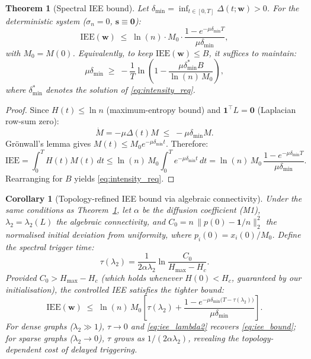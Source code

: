\documentclass[review,12pt]{elsarticle}
\newcommand{\bfw}{\mathbf{w}}
\newcommand{\IEE}{\mathrm{IEE}}
\newcommand{\Hc}{H_c}
\newcommand{\Hmax}{H_{\max}}
\newcommand{\lambdat}{\lambda_2}
\newtheorem{theorem}{Theorem}
\newtheorem{corollary}{Corollary}
\begin{document}
\begin{theorem}[Spectral IEE bound]
\label{thm:iee_bound}
Let $\delta_{\min} = \inf_{t\in[0,T]}\Delta(t;\bfw) > 0$.
For the deterministic system ($\sigma_n = 0$, $\mathbf{s}\equiv\mathbf{0}$):
\begin{equation}
  \IEE(\bfw) \;\leq\; \ln(n)\cdot M_0 \cdot
  \frac{1 - e^{-\mu\delta_{\min}T}}{\mu\delta_{\min}},
  \label{eq:iee_bound}
\end{equation}
with $M_0 = M(0)$.  Equivalently, to keep $\IEE(\bfw) \leq B$, it suffices
to maintain:
\begin{equation}
  \mu\delta_{\min} \;\geq\;
  -\frac{1}{T}\ln\!\left(1 - \frac{\mu\delta_{\min}^* B}{\ln(n)\,M_0}\right),
  \label{eq:intensity_req}
\end{equation}
where $\delta_{\min}^*$ denotes the solution of \eqref{eq:intensity_req}.
\end{theorem}

\begin{proof}
Since $H(t) \leq \ln n$ (maximum-entropy bound) and
$\mathbf{1}^\top L = \mathbf{0}$ (Laplacian row-sum zero):
\[
  \dot{M} = -\mu\Delta(t)M \;\leq\; -\mu\delta_{\min}M.
\]
Grönwall's lemma gives $M(t) \leq M_0 e^{-\mu\delta_{\min}t}$.  Therefore:
\[
  \IEE = \int_0^T H(t)M(t)\,dt
  \leq \ln(n)\,M_0\int_0^T e^{-\mu\delta_{\min}t}\,dt
  = \ln(n)\,M_0\,\frac{1-e^{-\mu\delta_{\min}T}}{\mu\delta_{\min}}.
\]
Rearranging for $B$ yields \eqref{eq:intensity_req}.
\end{proof}

\begin{corollary}[Topology-refined IEE bound via algebraic connectivity]
\label{cor:lambda2}
Under the same conditions as Theorem~\ref{thm:iee_bound}, let $\alpha$
be the diffusion coefficient (M1), $\lambdat = \lambda_2(L)$ the algebraic
connectivity, and $C_0 = n\,\|p(0) - \mathbf{1}/n\|_2^2$ the normalised
initial deviation from uniformity, where $p_i(0) = x_i(0)/M_0$.
Define the \emph{spectral trigger time}:
\begin{equation}
  \tau(\lambdat) = \frac{1}{2\alpha\lambdat}
    \ln\!\frac{C_0}{\Hmax - \Hc}.
  \label{eq:tau_lambda}
\end{equation}
Provided $C_0 > \Hmax - \Hc$ (which holds whenever $H(0) < \Hc$,
guaranteed by our initialisation), the controlled IEE satisfies the
tighter bound:
\begin{equation}
  \IEE(\bfw) \;\leq\; \ln(n)\,M_0\!\left[
    \tau(\lambdat) +
    \frac{1 - e^{-\mu\delta_{\min}\bigl(T - \tau(\lambdat)\bigr)}}{\mu\delta_{\min}}
  \right].
  \label{eq:iee_lambda2}
\end{equation}
For dense graphs ($\lambdat \gg 1$), $\tau \to 0$ and \eqref{eq:iee_lambda2}
recovers \eqref{eq:iee_bound}; for sparse graphs ($\lambdat \to 0$),
$\tau$ grows as $1/(2\alpha\lambdat)$, revealing the topology-dependent
cost of delayed triggering.
\end{corollary}
\end{document}
